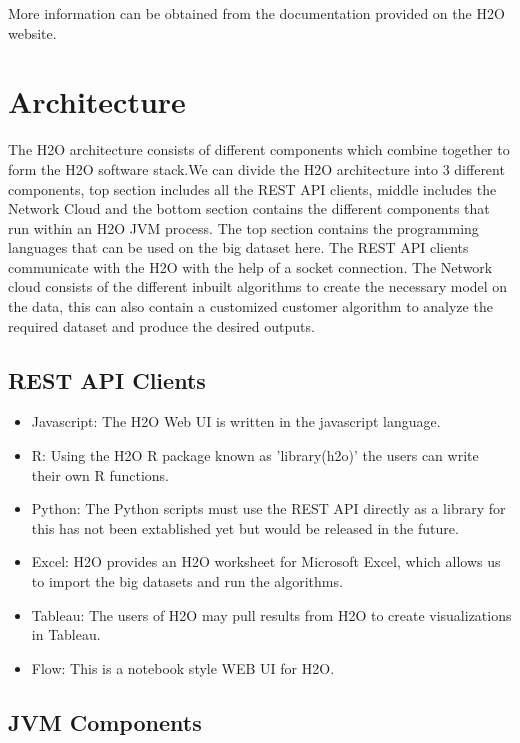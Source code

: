 \documentclass[9pt,twocolumn,twoside]{../../styles/osajnl}
\begin{document}
More information can be obtained from the documentation provided on
the H2O website\cite{www-h2o-requirements}.

\section{Architecture}

The H2O architecture consists of different components which combine
together to form the H2O software stack.\newline We can divide the H2O
architecture into 3 different components, top section includes all the
REST API clients, middle includes the Network Cloud and the bottom
section contains the different components that run within an H2O JVM
process\cite{www-h2o-architecture}. The top section contains the
programming languages that can be used on the big dataset here. The
REST API clients communicate with the H2O with the help of a socket
connection\cite{www-h2o-architecture}. The Network cloud consists of
the different inbuilt algorithms to create the necessary model on the
data, this can also contain a customized customer algorithm to analyze
the required dataset and produce the desired outputs.


\subsection{REST API Clients}

\begin{itemize}
  \item Javascript: The H2O Web UI is written in the javascript language.
\item R: Using the H2O R package known as 'library(h2o)' the users can write their own R functions.
\item Python: The Python scripts must use the REST API directly as a library for this has not been extablished yet but would be released in the future.
\item Excel: H2O provides an H2O worksheet for Microsoft Excel, which allows us to import the big datasets and run the algorithms.
\item Tableau: The users of H2O may pull results from H2O to create visualizations in Tableau.
\item Flow: This is a notebook style WEB UI for H2O\cite{www-h2o-architecture}.
\end{itemize}

\subsection{JVM Components}
\end{document}
